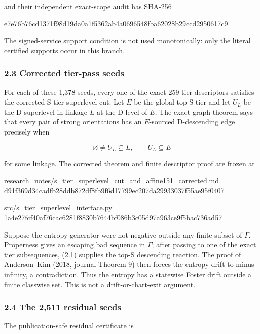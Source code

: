 and their independent exact-scope audit has SHA-256

\begin{CodeBlock}
e7e76b76cd1371f98d19da0a1f5362ab4a0696548fba62028b29ccd2950617c9.
\end{CodeBlock}

The signed-service support condition is not used monotonically: only the
literal certified supports occur in this branch.

\subsubsection{2.3 Corrected tier-pass
seeds}

For each of these 1,378 seeds, every one of the exact 259 tier
descriptors satisfies the corrected S-tier-superlevel cut. Let \(E\) be
the global top S-tier and let \(U_L\) be the D-superlevel in linkage
\(L\) at the D-level of \(E\). The exact graph theorem says that every
pair of strong orientations has an \(E\)-sourced D-descending edge
precisely when

\[
       \varnothing\ne U_L\subsetneq L,
       \qquad U_L\subseteq E                         \tag{2.1}
\]

for some linkage. The corrected theorem and finite descriptor proof are
frozen at

\begin{CodeBlock}
research_notes/s_tier_superlevel_cut_and_affine151_corrected.md
d91f369d34cadfb28ddb872df8fb9f6d17799ec207da29933037f55ae95f0407

src/s_tier_superlevel_interface.py
1a4e27fcf40af76cac6281f8830b7644bf086b3c05d97a963ce9f5bac736ad57
\end{CodeBlock}

Suppose the entropy generator were not negative outside any finite
subset of \(\Gamma\). Properness gives an escaping bad sequence in
\(\Gamma\); after passing to one of the exact tier subsequences, (2.1)
supplies the top-S descending reaction. The proof of Anderson--Kim
(2018, journal Theorem 9) then forces the entropy drift to minus
infinity, a contradiction. Thus the entropy has a statewise Foster drift
outside a finite classwise set. This is not a drift-or-chart-exit
argument.

\subsubsection{2.4 The 2,511 residual
seeds}

The publication-safe residual certificate is

